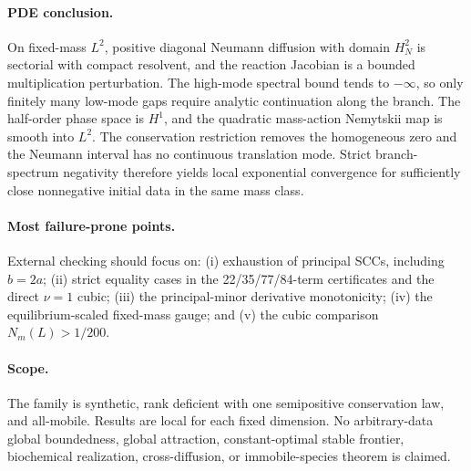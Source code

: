 \documentclass[10pt]{article}
\begin{document}
\paragraph{PDE conclusion.}
On fixed-mass $L^2$, positive diagonal Neumann diffusion with domain $H_N^2$
is sectorial with compact resolvent, and the reaction Jacobian is a bounded
multiplication perturbation.  The high-mode spectral bound tends to
$-\infty$, so only finitely many low-mode gaps require analytic continuation
along the branch.  The half-order phase space is $H^1$, and the quadratic
mass-action Nemytskii map is smooth into $L^2$.  The conservation restriction
removes the homogeneous zero and the Neumann interval has no continuous
translation mode.  Strict branch-spectrum negativity therefore yields local
exponential convergence for sufficiently close nonnegative initial data in
the same mass class.

\paragraph{Most failure-prone points.}
External checking should focus on: (i) exhaustion of principal SCCs, including
$b=2a$; (ii) strict equality cases in the 22/35/77/84-term certificates and
the direct $\nu=1$ cubic; (iii) the principal-minor derivative monotonicity;
(iv) the equilibrium-scaled fixed-mass gauge; and (v) the cubic comparison
$N_m(L)>1/200$.

\paragraph{Scope.}
The family is synthetic, rank deficient with one semipositive conservation law, and all-mobile. Results are local for each fixed dimension. No arbitrary-data global boundedness, global attraction, constant-optimal stable frontier, biochemical realization, cross-diffusion, or immobile-species theorem is claimed.
\end{document}
